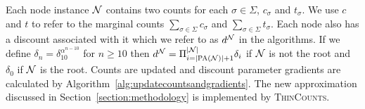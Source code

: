 Each node instance $\N$ contains two counts for each $\sigma \in \Sigma$, $c_\sigma$ and $t_\sigma$.  We use $c$ and $t$ to refer to the marginal counts $\sum_{\sigma \in \Sigma} c_\sigma$ and $\sum_{\sigma \in \Sigma} t_\sigma$.  Each node also has a discount associated with it which we refer to as $d^\N$ in the algorithms. If we define $\delta_{n} = \delta_{10}^{\alpha^{n - 10}}$ for $n \geq 10$ then $d^{\N} = \Pi_{i =|\textsc{PA}(\N)| + 1}^{|\N|} \delta_{i}$ if $\N$ is not the root and $\delta_{0}$ if $\N$ is the root.  Counts are updated and discount parameter gradients are calculated by Algorithm~\ref{alg:updatecountsandgradients}.  The new approximation discussed in Section~\ref{section:methodology} is implemented by \textsc{ThinCounts}.



